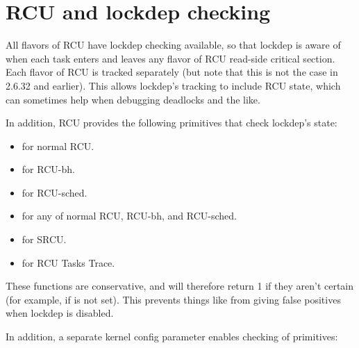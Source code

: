 
\section{RCU and lockdep checking}
\label{sec:rcu:RCU and lockdep checking}

All flavors of RCU have lockdep checking available, so that lockdep is
aware of when each task enters and leaves any flavor of RCU read-side
critical section.
Each flavor of RCU is tracked separately (but note
that this is not the case in 2.6.32 and earlier).
This allows lockdep's
tracking to include RCU state, which can sometimes help when debugging
deadlocks and the like.

In addition, RCU provides the following primitives that check lockdep's
state:

\begin{itemize}
\item	{} for normal RCU.
\item	{} for RCU-bh.
\item	{} for RCU-sched.
\item	{} for any of normal RCU, RCU-bh, and RCU-sched.
\item	{} for SRCU.
\item	{} for RCU Tasks Trace.
\end{itemize}

These functions are conservative, and will therefore return 1 if they
aren't certain (for example, if  is not set).
This prevents things like  from giving false
positives when lockdep is disabled.

In addition, a separate kernel config parameter  enables
checking of  primitives:

